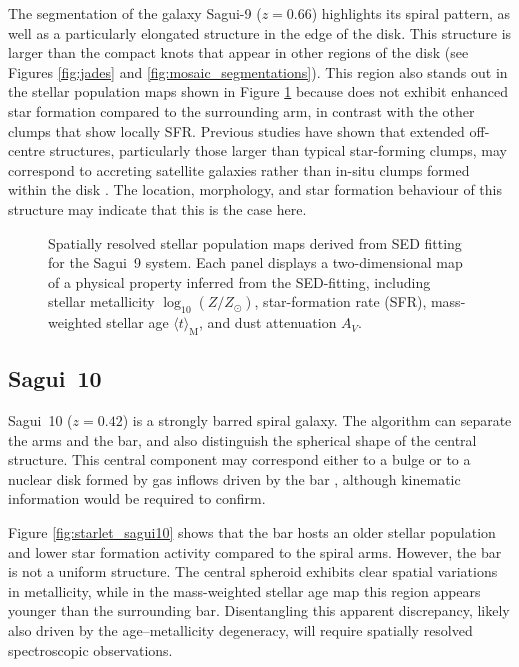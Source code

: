 \documentclass[fleqn,usenatbib]{mnras}
\begin{document}
The segmentation of the galaxy Sagui-9 ($z=0.66$) highlights its spiral pattern, as well as a particularly elongated structure in the edge of the disk. This structure is larger than the compact knots that appear in other regions of the disk (see Figures \ref{fig:jades} and \ref{fig:mosaic_segmentations}). This region also stands out in the stellar population maps shown in Figure \ref{fig:starlet_sagui9} because does not exhibit enhanced star formation compared to the surrounding arm, in contrast with the other clumps that show locally SFR. Previous studies have shown that extended off-centre structures, particularly those larger than typical star-forming clumps, may correspond to accreting satellite galaxies rather than in-situ clumps formed within the disk \citep[e.g.][]{zanella2019}. The location, morphology, and star formation behaviour of this structure may indicate that this is the case here.
 

\begin{figure}
\centering
{}
\caption{Spatially resolved stellar population maps derived from SED fitting for the Sagui~9 system. Each panel displays a two-dimensional map of a physical property inferred from the SED-fitting, including stellar metallicity $\log_{10}(Z/Z_\odot)$, star-formation rate (SFR), mass-weighted stellar age $\langle t\rangle_{\mathrm{M}}$, and dust attenuation $A_V$.}
\label{fig:starlet_sagui9}
\end{figure}



\subsection{Sagui~10}

Sagui~10 ($z=0.42$) is a strongly barred spiral galaxy. The algorithm can separate the arms and the bar, and also distinguish the spherical shape of the central structure. This central component may correspond either to a bulge or to a nuclear disk formed by gas inflows driven by the bar \citep{kormendy2004}, although kinematic information would be required to confirm. 

Figure \ref{fig:starlet_sagui10} shows that the bar hosts an older stellar population and lower star formation activity compared to the spiral arms. However, the bar is not a uniform structure. The central spheroid exhibits clear spatial variations in metallicity, while in the mass-weighted stellar age map this region appears younger than the surrounding bar. Disentangling this apparent discrepancy, likely also driven by the age–metallicity degeneracy, will require spatially resolved spectroscopic observations.
\end{document}
